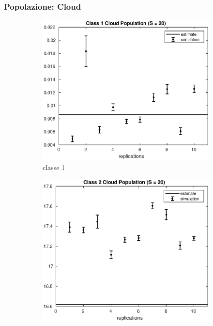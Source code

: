 \subsubsection{Popolazione: Cloud}
%
\begin{figure}[!h]
\centering
%
\begin{subfigure}[t]{0.49\textwidth}
\includegraphics[width=\textwidth]{figures/simul/20_500K_n1cloud}
\caption{classe 1}
\label{20_n1cloud}
\end{subfigure}
%
\begin{subfigure}[t]{0.49\textwidth}
\includegraphics[width=\textwidth]{figures/simul/20_500K_n2cloud}

\end{subfigure}
\end{figure}
